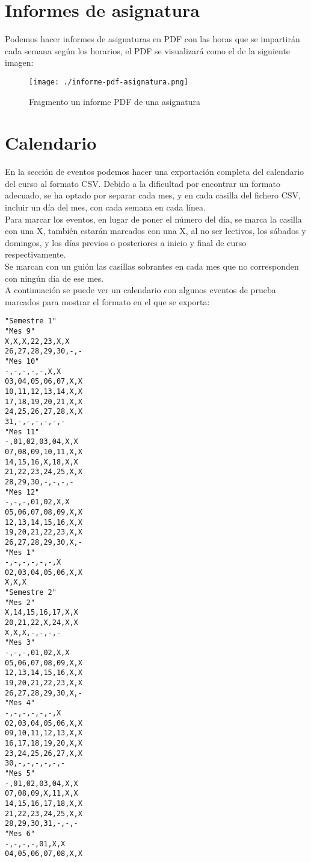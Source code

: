 \section{Informes de asignatura}
 
Podemos hacer informes de asignaturas en PDF con las horas que se impartirán cada semana según los horarios, el PDF se visualizará como el de la siguiente imagen:

\begin{figure}[H] 
  \label{informes-asignatura} 
	\begin{center}
    \texttt{[image: ./informe-pdf-asignatura.png]}
  \end{center}
\caption{Fragmento un informe PDF de una asignatura}
\end{figure}

\section{Calendario}

En la sección de eventos podemos hacer una exportación completa del calendario del curso al formato CSV. Debido a la dificultad por encontrar un formato adecuado, se ha optado por separar cada mes, y en cada casilla del fichero CSV, incluir un día del mes, con cada semana en cada línea.
\\
Para marcar los eventos, en lugar de poner el número del día, se marca la casilla con una X, también estarán marcados con una X, al no ser lectivos, los sábados y domingos, y los días previos o posteriores a inicio y final de curso respectivamente. 
\\
Se marcan con un guión las casillas sobrantes en cada mes que no corresponden con ningún día de ese mes.
\\
A continuación se puede ver un calendario con algunos eventos de prueba marcados para mostrar el formato en el que se exporta:

\begin{verbatim}
"Semestre 1"
"Mes 9"
X,X,X,22,23,X,X
26,27,28,29,30,-,-
"Mes 10"
-,-,-,-,-,X,X
03,04,05,06,07,X,X
10,11,12,13,14,X,X
17,18,19,20,21,X,X
24,25,26,27,28,X,X
31,-,-,-,-,-,-
"Mes 11"
-,01,02,03,04,X,X
07,08,09,10,11,X,X
14,15,16,X,18,X,X
21,22,23,24,25,X,X
28,29,30,-,-,-,-
"Mes 12"
-,-,-,01,02,X,X
05,06,07,08,09,X,X
12,13,14,15,16,X,X
19,20,21,22,23,X,X
26,27,28,29,30,X,-
"Mes 1"
-,-,-,-,-,-,X
02,03,04,05,06,X,X
X,X,X
"Semestre 2"
"Mes 2"
X,14,15,16,17,X,X
20,21,22,X,24,X,X
X,X,X,-,-,-,-
"Mes 3"
-,-,-,01,02,X,X
05,06,07,08,09,X,X
12,13,14,15,16,X,X
19,20,21,22,23,X,X
26,27,28,29,30,X,-
"Mes 4"
-,-,-,-,-,-,X
02,03,04,05,06,X,X
09,10,11,12,13,X,X
16,17,18,19,20,X,X
23,24,25,26,27,X,X
30,-,-,-,-,-,-
"Mes 5"
-,01,02,03,04,X,X
07,08,09,X,11,X,X
14,15,16,17,18,X,X
21,22,23,24,25,X,X
28,29,30,31,-,-,-
"Mes 6"
-,-,-,-,01,X,X
04,05,06,07,08,X,X

\end{verbatim}
